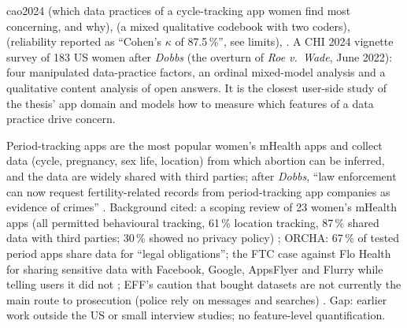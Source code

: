 \begin{papercard}{cao2024}
  (which data practices of a cycle-tracking app women find most concerning, and why),  (a mixed qualitative codebook with two coders),  (reliability reported as ``Cohen's $\kappa$ of 87.5\,\%'', see limits), . A CHI 2024 vignette survey of 183 US women after \emph{Dobbs} (the overturn of \emph{Roe v.\ Wade}, June 2022): four manipulated data-practice factors, an ordinal mixed-model analysis and a qualitative content analysis of open answers. It is the closest user-side study of the thesis' app domain and models how to measure which features of a data practice drive concern.

 Period-tracking apps are the most popular women's mHealth apps and collect data (cycle, pregnancy, sex life, location) from which abortion can be inferred, and the data are widely shared with third parties; after \emph{Dobbs}, ``law enforcement can now request fertility-related records from period-tracking app companies as evidence of crimes'' . Background cited: a scoping review of 23 women's mHealth apps (all permitted behavioural tracking, 61\,\% location tracking, 87\,\% shared data with third parties; 30\,\% showed no privacy policy) ; ORCHA: 67\,\% of tested period apps share data for ``legal obligations''; the FTC case against Flo Health for sharing sensitive data with Facebook, Google, AppsFlyer and Flurry while telling users it did not ; EFF's caution that bought datasets are not currently the main route to prosecution (police rely on messages and searches) . Gap: earlier work outside the US or small interview studies; no feature-level quantification.


\end{papercard}
